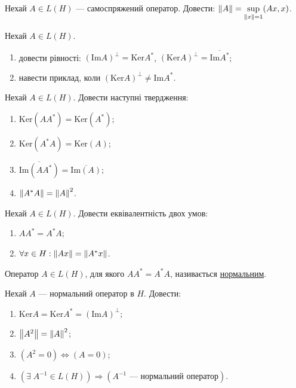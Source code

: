 
\begin{exercise}
    Нехай $A \in L(H)$ --- самоспряжений оператор.
    Довести: $\left\lVert A\right\rVert = \underset{\left\lVert x\right\rVert = 1}{\sup}(Ax, x)$.
\end{exercise}

\begin{exercise}
    Нехай $A \in L(H)$.
    \begin{enumerate}[label=\ukr*)]
        \item довести рівності: $(\mathrm{Im}A)^\perp = \mathrm{Ker}A^*$, $(\mathrm{Ker}A)^\perp = \overline{\mathrm{Im}A^*}$;
        \item навести приклад, коли $(\mathrm{Ker}A)^\perp \neq \mathrm{Im}A^*$.
    \end{enumerate}
\end{exercise}

\begin{exercise}
    Нехай $A \in L(H)$. Довести наступні твердження:
    \begin{enumerate}[label=\ukr*)]
        \item $\mathrm{Ker}(A A^*) = \mathrm{Ker}(A^*)$;
        \item $\mathrm{Ker}(A^* A) = \mathrm{Ker}(A)$;
        \item $\overline{\mathrm{Im} (A A^*)} = \overline{\mathrm{Im} (A)}$;
        \item $\left\lVert A^* A\right\rVert = \left\lVert A\right\rVert^2$.
    \end{enumerate}
\end{exercise}

\begin{exercise}
    Нехай $A \in L(H)$. Довести еквівалентність двох умов:
    \begin{enumerate}[label=\ukr*)]
        \item $A A^* = A^* A$;
        \item $\forall x \in H : \left\lVert Ax\right\rVert = \left\lVert A^{*}x\right\rVert$.
    \end{enumerate}
\end{exercise}

\begin{theory}
    Оператор $A \in L(H)$, для якого $A A^* = A^* A$, називається \uline{нормальним}.
\end{theory}

\begin{exercise}
    Нехай $A$ --- нормальний оператор в $H$. Довести:
    \begin{enumerate}[label=\ukr*)]
        \item $\mathrm{Ker} A = \mathrm{Ker} A^* = (\mathrm{Im} A)^\perp$;
        \item $\left\lVert A^2\right\rVert = \left\lVert A\right\rVert^2$;
        \item $(A^2 = 0) \Leftrightarrow (A = 0)$;
        \item $\left( \exists \; A^{-1} \in L(H)\right) \Rightarrow (A^{-1} \text{ --- нормальний оператор})$.
    \end{enumerate}
\end{exercise}

